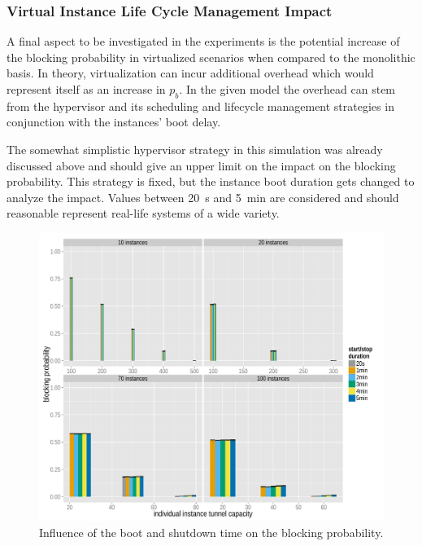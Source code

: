\subsubsection{Virtual Instance Life Cycle Management Impact}


A final aspect to be investigated in the experiments is the potential increase of the blocking probability in virtualized scenarios when compared to the monolithic basis. In theory, virtualization can incur additional overhead which would represent itself as an increase in $p_b$. In the given model the overhead can stem from the hypervisor and its scheduling  and lifecycle management strategies in conjunction with the instances' boot delay. 

The somewhat simplistic hypervisor strategy in this simulation was already discussed above and should give an upper limit on the impact on the blocking probability. This strategy is fixed, but the instance boot duration gets changed to analyze the impact. Values between \SI{20}{\second} and \SI{5}{\minute} are considered and should reasonable represent real-life systems of a wide variety.

\begin{figure}[htb]
	\centering
	\includegraphics[width=1.0\textwidth]{images/R-virtualized-startstop-blocking-barchart.pdf}
	\caption{Influence of the boot and shutdown time on the blocking probability.}
\label{c4:fig:blockprob-startstop-barchart}
\end{figure}


